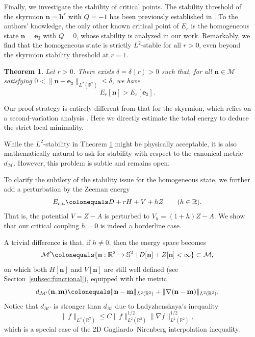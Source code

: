 \documentclass{amsart}
\numberwithin{equation}{section}
\newtheorem{theorem}{Theorem}[section]
\theoremstyle{definition}
\theoremstyle{remark}
\newcommand{\R}{\mathbb{R}}
\renewcommand{\S}{\mathbb{S}}
\newcommand{\boM}{\mathcal{M}}
\newcommand{\bh}{{\mathbf{h}}}
\newcommand{\bom}{{\mathbf{m}}}
\newcommand{\bn}{{\mathbf{n}}}
\newcommand{\boe}{{\mathbf{e}}}
\begin{document}
Finally, we investigate the stability of critical points.  
The stability threshold of the skyrmion $\bn = \bh^r$ with $Q = -1$ has been previously established in \cite{MR4630481}.  
To the authors' knowledge, the only other known critical point of $E_r$ is the homogeneous state $\bn = \boe_3$ with $Q = 0$, whose stability is analyzed in our work.  
Remarkably, we find that the homogeneous state is strictly $L^2$-stable for all $r > 0$, even beyond the skyrmion stability threshold at $r = 1$.

\begin{theorem}\label{thm:main2_stability}
    Let $r>0$.  
    There exists $\delta=\delta(r)>0$ such that, for all $\bn\in \boM$ satisfying $0<\|\bn-\boe_3\|_{L^2(\R^2)}\leq \delta$, we have
    \[
        E_{r}[\bn] > E_{r}[\boe_3].
    \]
\end{theorem}

Our proof strategy is entirely different from that for the skyrmion, which relies on a second-variation analysis \cite{MR4630481}.  
Here we directly estimate the total energy to deduce the strict local minimality.

While the $L^2$-stability in Theorem \ref{thm:main2_stability} might be physically acceptable, it is also mathematically natural to ask for stability with respect to the canonical metric $d_\boM$.
However, this problem is subtle and remains open.

\medskip

To clarify the subtlety of the stability issue for the homogeneous state, we further add a perturbation by the Zeeman energy 
\begin{equation}\label{eq:E_rh}
    E_{r,h}\colonequals D+rH+V+hZ \qquad (h\in\R).
\end{equation}
That is, the potential $V=Z-A$ is perturbed to $V_h=(1+h)Z-A$. We show that our critical coupling $h=0$ is indeed a borderline case. 

A trivial difference is that, if $h\neq0$, then the energy space becomes
\begin{equation}\label{eq:space_M'}
    \boM'\colonequals\{\bn:\R^2\to\S^2 \mid D[\bn]+Z[\bn]<\infty \}\subset\boM,
\end{equation}
on which both $H[\bn]$ and $V[\bn]$ are still well defined (see Section~\ref{subsec:functional}), equipped with the metric
\[
d_{\boM'}(\bn,\bom)\colonequals\|\bn-\bom\|_{L^2(\R^2)}+\|\nabla(\bn-\bom)\|_{L^2(\R^2)}.
\]
Notice that $d_{\boM'}$ is stronger than $d_\boM$ 
due to Ladyzhenskaya's inequality
\begin{equation}\label{eq:Ladyzhenskaya}
    \|f\|_{L^4(\R^2)}\leq C\|f\|_{L^2(\R^2)}^{1/2}\|\nabla f\|_{L^2(\R^2)}^{1/2},
\end{equation}
which is a special case of the 2D Gagliardo--Nirenberg interpolation inequality.
\end{document}

